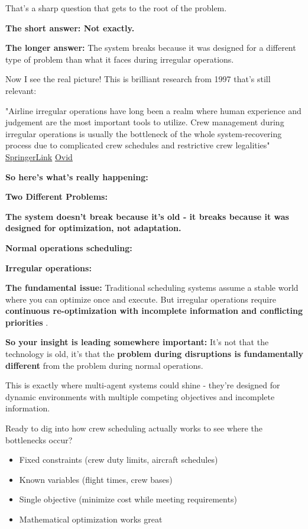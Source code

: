 \begin{botresponse}
That's a sharp question that gets to the root of the problem.

\textbf{The short answer: Not exactly.}

\textbf{The longer answer:} The system breaks because it was designed for a different type of problem than what it faces during irregular operations.

Now I see the real picture! This is brilliant research from 1997 that's still relevant:

"Airline irregular operations have long been a realm where human experience and judgement are the most important tools to utilize. Crew management during irregular operations is usually the bottleneck of the whole system-recovering process due to complicated crew schedules and restrictive crew legalities" \href{https://link.springer.com/article/10.1023/A:1009780410798}{SpringerLink} \href{https://insights.ovid.com/combinatorial-optimization/jcoop/1997/01/030/optimization-model-algorithm-crew-management/6/00123368}{Ovid}

\textbf{So here's what's really happening:}

\textbf{Two Different Problems:}

\textbf{The system doesn't break because it's old - it breaks because it was designed for optimization, not adaptation.}

\textbf{Normal operations scheduling:}

\textbf{Irregular operations:}

\textbf{The fundamental issue:} Traditional scheduling systems assume a stable world where you can optimize once and execute. But irregular operations require \textbf{continuous re-optimization with incomplete information and conflicting priorities} .

\textbf{So your insight is leading somewhere important:} It's not that the technology is old, it's that the \textbf{problem during disruptions is fundamentally different} from the problem during normal operations.

This is exactly where multi-agent systems could shine - they're designed for dynamic environments with multiple competing objectives and incomplete information.

Ready to dig into how crew scheduling actually works to see where the bottlenecks occur?

\begin{itemize}
\item Fixed constraints (crew duty limits, aircraft schedules)
\item Known variables (flight times, crew bases)
\item Single objective (minimize cost while meeting requirements)
\item Mathematical optimization works great
\end{itemize}


\end{botresponse}
